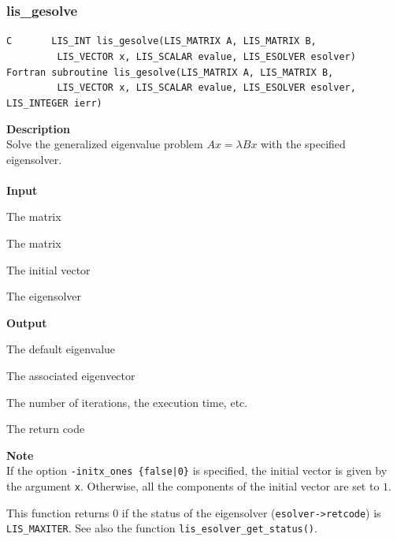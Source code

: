 \documentclass[a4paper]{article}
\newcommand{\namelistlabel}[1]{\mbox{#1}\hfill}
\newenvironment{namelist}[1]{%
\begin{list}{}
  {\let\makelabel\namelistlabel
  \settowidth{\labelwidth}{#1}
  \setlength{\leftmargin}{1.1\labelwidth}}
  }{%
\end{list}}
\begin{document}
\subsubsection{lis\_gesolve}
\begin{screen}
\verb|C       LIS_INT lis_gesolve(LIS_MATRIX A, LIS_MATRIX B,|\\ 
\verb|         LIS_VECTOR x, LIS_SCALAR evalue, LIS_ESOLVER esolver)|\\
\verb|Fortran subroutine lis_gesolve(LIS_MATRIX A, LIS_MATRIX B,|\\
\verb|         LIS_VECTOR x, LIS_SCALAR evalue, LIS_ESOLVER esolver, LIS_INTEGER ierr)|
\end{screen}
{\bf Description}\\
\indent
Solve the generalized eigenvalue problem $Ax = \lambda Bx$ with the specified eigensolver.
\\ \\
\noindent
{\bf Input}
\begin{namelist}{XXXXXXXXXXXXXXXXXXXX}
\item[\tt A] The matrix
\item[\tt B] The matrix  
\item[\tt x] The initial vector
\item[\tt esolver] The eigensolver
\end{namelist}
{\bf Output}
\begin{namelist}{XXXXXXXXXXXXXXXXXXXX}
\item[\tt evalue] The default eigenvalue
\item[\tt x] The associated eigenvector
\item[\tt esolver] The number of iterations, the execution time, etc.
\item[\tt ierr] The return code
\end{namelist}
{\bf Note}\\
\indent
If the option {\tt -initx\_ones \{false|0\}} is specified, the initial
vector is given by the argument {\tt x}.
Otherwise, all the components of the initial vector are set to $1$. 

This function returns 0 if the status of the eigensolver ({\tt esolver->retcode})
is {\tt LIS\_MAXITER}. See also the function
{\tt lis\_esolver\_get\_status()}. 

\newpage
\end{document}
